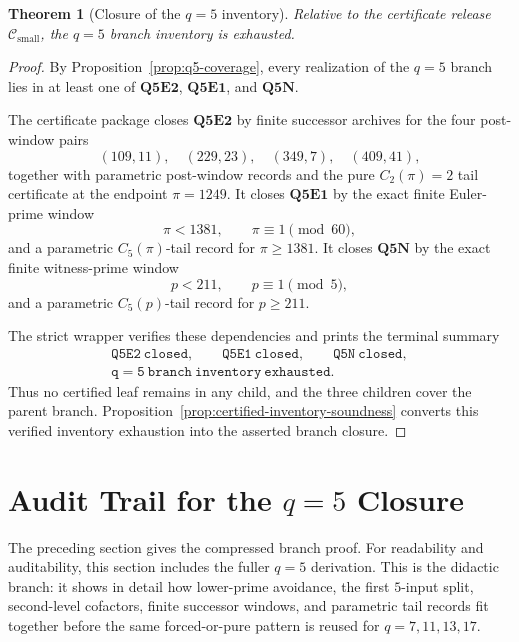 \documentclass[11pt]{article}
\newtheorem{theorem}{Theorem}[section]
\theoremstyle{definition}
\theoremstyle{remark}
\newcommand{\Csmall}{\ensuremath{\mathcal C_{\mathrm{small}}}}
\begin{document}
\begin{theorem}[Closure of the \(q=5\) inventory]
\label{thm:q5-closed}
Relative to the certificate release \(\Csmall\), the \(q=5\) branch inventory is
exhausted.
\end{theorem}

\begin{proof}
By Proposition~\ref{prop:q5-coverage}, every realization of the \(q=5\) branch
lies in at least one of \(\mathbf{Q5E2}\), \(\mathbf{Q5E1}\), and
\(\mathbf{Q5N}\).

The certificate package closes \(\mathbf{Q5E2}\) by finite successor archives
for the four post-window pairs
\[
  (109,11),\quad (229,23),\quad (349,7),\quad (409,41),
\]
together with parametric post-window records and the pure
\(C_2(\pi)=2\) tail certificate at the endpoint \(\pi=1249\).  It closes
\(\mathbf{Q5E1}\) by
the exact finite Euler-prime window
\[
  \pi<1381,\qquad \pi\equiv1\pmod{60},
\]
and a parametric \(C_5(\pi)\)-tail record for \(\pi\ge1381\).  It closes
\(\mathbf{Q5N}\) by the exact finite witness-prime window
\[
  p<211,\qquad p\equiv1\pmod5,
\]
and a parametric \(C_5(p)\)-tail record for \(p\ge211\).

The strict wrapper verifies these dependencies and prints the terminal summary
\[
\begin{gathered}
  \mathtt{Q5E2\ closed},\qquad
  \mathtt{Q5E1\ closed},\qquad
  \mathtt{Q5N\ closed},\\
  \mathtt{q=5\ branch\ inventory\ exhausted}.
\end{gathered}
\]
Thus no certified leaf remains in any child, and the three children cover the
parent branch.  Proposition~\ref{prop:certified-inventory-soundness} converts
this verified inventory exhaustion into the asserted branch closure.
\end{proof}

\section{Audit Trail for the \(q=5\) Closure}
\label{sec:q5-expanded-derivation}

The preceding section gives the compressed branch proof.  For readability and
auditability, this section includes the fuller \(q=5\) derivation.  This is the
didactic branch: it shows in detail how lower-prime avoidance, the first
\(5\)-input split, second-level cofactors, finite successor windows, and
parametric tail records fit together before the same forced-or-pure pattern is
reused for \(q=7,11,13,17\).
\end{document}

